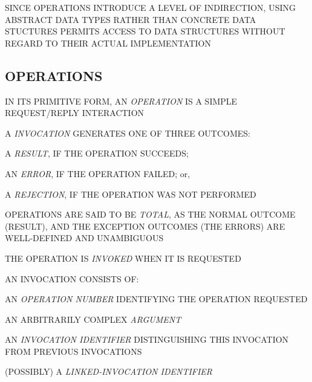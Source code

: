 \begin{bwslide}

\begin{nrtc}
\item	SINCE OPERATIONS INTRODUCE A LEVEL OF INDIRECTION,
	USING ABSTRACT DATA TYPES RATHER THAN CONCRETE DATA STUCTURES
	PERMITS ACCESS TO DATA STRUCTURES WITHOUT REGARD TO THEIR ACTUAL
	IMPLEMENTATION
\end{nrtc}
\end{bwslide}


\begin{bwslide}
\part*	{OPERATIONS}\bf

\begin{nrtc}
\item	IN ITS PRIMITIVE FORM,
	AN \emph{OPERATION} IS A SIMPLE REQUEST/REPLY INTERACTION

\item	A \emph{INVOCATION} GENERATES ONE OF THREE OUTCOMES:
    \begin{nrtc}
    \item	A \emph{RESULT}, IF THE OPERATION SUCCEEDS;

    \item	AN \emph{ERROR}, IF THE OPERATION FAILED; or,

    \item	A \emph{REJECTION}, IF THE OPERATION WAS NOT PERFORMED
    \end{nrtc}

\item	OPERATIONS ARE SAID TO BE \emph{TOTAL}, AS THE NORMAL OUTCOME (RESULT),
	AND THE EXCEPTION OUTCOMES (THE ERRORS) ARE WELL-DEFINED AND
	UNAMBIGUOUS
\end{nrtc}
\end{bwslide}


\begin{bwslide}

\begin{nrtc}
\item	THE OPERATION IS \emph{INVOKED} WHEN IT IS REQUESTED

\item	AN INVOCATION CONSISTS OF:
    \begin{nrtc}
    \item	AN \emph{OPERATION NUMBER} IDENTIFYING THE OPERATION REQUESTED

    \item	AN ARBITRARILY COMPLEX \emph{ARGUMENT}

    \item	AN \emph{INVOCATION IDENTIFIER} DISTINGUISHING THIS INVOCATION
		FROM PREVIOUS INVOCATIONS

    \item	(POSSIBLY) A \emph{LINKED-INVOCATION IDENTIFIER}
    \end{nrtc}
\end{nrtc}
\end{bwslide}


